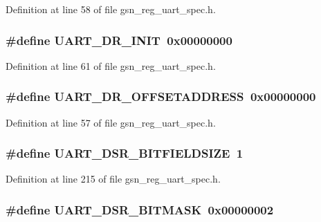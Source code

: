 Definition at line 58 of file gsn\_\-reg\_\-uart\_\-spec.h.

\hypertarget{a00575_a99b3674088a38772dc77add311d134d1}{
\subsubsection[{UART\_\-DR\_\-INIT}]{\setlength{\rightskip}{0pt plus 5cm}\#define UART\_\-DR\_\-INIT~0x00000000}}
\label{a00575_a99b3674088a38772dc77add311d134d1}


Definition at line 61 of file gsn\_\-reg\_\-uart\_\-spec.h.

\hypertarget{a00575_ac55f4c04a3f35d078d2f955aa90de227}{
\subsubsection[{UART\_\-DR\_\-OFFSETADDRESS}]{\setlength{\rightskip}{0pt plus 5cm}\#define UART\_\-DR\_\-OFFSETADDRESS~0x00000000}}
\label{a00575_ac55f4c04a3f35d078d2f955aa90de227}


Definition at line 57 of file gsn\_\-reg\_\-uart\_\-spec.h.

\hypertarget{a00575_ace40f3c42c422574204b4ae84ce99b23}{
\subsubsection[{UART\_\-DSR\_\-BITFIELDSIZE}]{\setlength{\rightskip}{0pt plus 5cm}\#define UART\_\-DSR\_\-BITFIELDSIZE~1}}
\label{a00575_ace40f3c42c422574204b4ae84ce99b23}


Definition at line 215 of file gsn\_\-reg\_\-uart\_\-spec.h.

\hypertarget{a00575_abdb0e3a72a190bf82834485e989aae1d}{
\subsubsection[{UART\_\-DSR\_\-BITMASK}]{\setlength{\rightskip}{0pt plus 5cm}\#define UART\_\-DSR\_\-BITMASK~0x00000002}}
\label{a00575_abdb0e3a72a190bf82834485e989aae1d}


